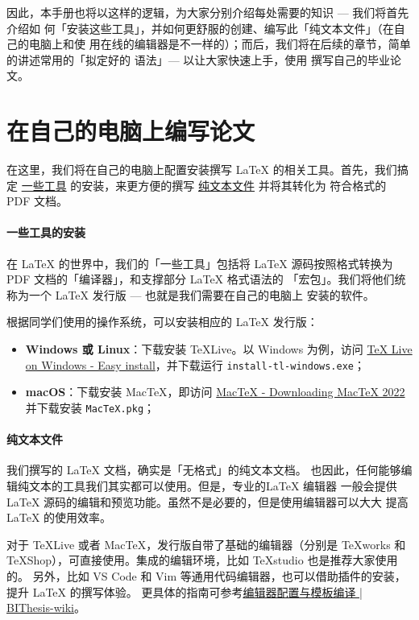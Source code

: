 因此，本手册也将以这样的逻辑，为大家分别介绍每处需要的知识 --- 我们将首先介绍如
何「安装这些工具」，并如何更舒服的创建、编写此「纯文本文件」（在自己的电脑上和使
用在线的编辑器是不一样的）；而后，我们将在后续的章节，简单的讲述常用的「拟定好的
语法」--- 以让大家快速上手，使用 \BIThesis{} 撰写自己的毕业论文。

\section{在自己的电脑上编写论文}

在这里，我们将在自己的电脑上配置安装撰写 \LaTeX{} 的相关工具。首先，我们搞定
\underline{一些工具} 的安装，来更方便的撰写 \underline{纯文本文件} 并将其转化为
符合格式的 PDF 文档。

\paragraph{一些工具的安装} 在 \LaTeX{} 的世界中，我们的「一些工具」包括将
\LaTeX{} 源码按照格式转换为 PDF 文档的「编译器」，和支撑部分 \LaTeX{} 格式语法的
「宏包」。我们将他们统称为一个 \LaTeX{} 发行版 --- 也就是我们需要在自己的电脑上
安装的软件。

根据同学们使用的操作系统，可以安装相应的 \LaTeX{} 发行版：

\begin{itemize}[noitemsep]
  \item \textbf{Windows 或 Linux}：下载安装 \TeX{}Live。以 Windows 为例，访问
  \href{https://www.tug.org/texlive/windows.html}{TeX Live on Windows - Easy
  install}，并下载运行 \texttt{install-tl-windows.exe}；
  \item \textbf{macOS}：下载安装 Mac\TeX{}，即访问
  \href{https://www.tug.org/mactex/mactex-download.html}{MacTeX - Downloading
  MacTeX 2022} 并下载安装 \texttt{MacTeX.pkg}；
\end{itemize}

\paragraph{纯文本文件} 我们撰写的 \LaTeX{} 文档，确实是「无格式」的纯文本文档。
也因此，任何能够编辑纯文本的工具我们其实都可以使用。但是，专业的\LaTeX{} 编辑器
一般会提供 \LaTeX{} 源码的编辑和预览功能。虽然不是必要的，但是使用编辑器可以大大
提高\LaTeX{} 的使用效率。

对于 \TeX{}Live 或者 Mac\TeX，发行版自带了基础的编辑器（分别是 \TeX{}works 和
\TeX{}Shop），可直接使用。集成的编辑环境，比如 \TeX{}studio 也是推荐大家使用的。
另外，比如 VS Code 和 Vim 等通用代码编辑器，也可以借助插件的安装，提升 \LaTeX{}
的撰写体验。
更具体的指南可参考\href{https://bithesis.bitnp.net/guide/configure-and-compile.html}{编辑器配置与模板编译 | BIThesis-wiki}。


